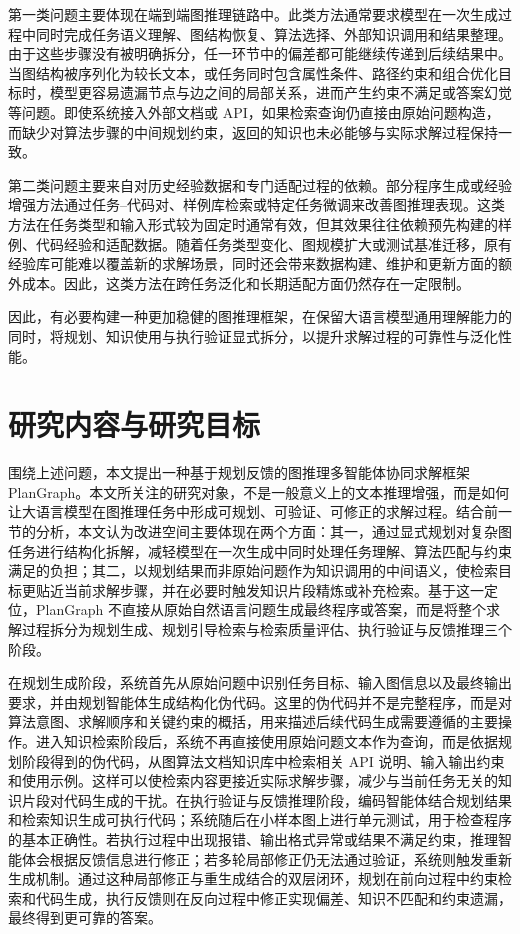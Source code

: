 第一类问题主要体现在端到端图推理链路中。此类方法通常要求模型在一次生成过程中同时完成任务语义理解、图结构恢复、算法选择、外部知识调用和结果整理。由于这些步骤没有被明确拆分，任一环节中的偏差都可能继续传递到后续结果中。当图结构被序列化为较长文本，或任务同时包含属性条件、路径约束和组合优化目标时，模型更容易遗漏节点与边之间的局部关系，进而产生约束不满足或答案幻觉等问题。即使系统接入外部文档或 API，如果检索查询仍直接由原始问题构造，而缺少对算法步骤的中间规划约束，返回的知识也未必能够与实际求解过程保持一致。

第二类问题主要来自对历史经验数据和专门适配过程的依赖。部分程序生成或经验增强方法通过任务--代码对、样例库检索或特定任务微调来改善图推理表现。这类方法在任务类型和输入形式较为固定时通常有效，但其效果往往依赖预先构建的样例、代码经验和适配数据。随着任务类型变化、图规模扩大或测试基准迁移，原有经验库可能难以覆盖新的求解场景，同时还会带来数据构建、维护和更新方面的额外成本。因此，这类方法在跨任务泛化和长期适配方面仍然存在一定限制。

因此，有必要构建一种更加稳健的图推理框架，在保留大语言模型通用理解能力的同时，将规划、知识使用与执行验证显式拆分，以提升求解过程的可靠性与泛化性能。

\section{研究内容与研究目标}

围绕上述问题，本文提出一种基于规划反馈的图推理多智能体协同求解框架 PlanGraph。本文所关注的研究对象，不是一般意义上的文本推理增强，而是如何让大语言模型在图推理任务中形成可规划、可验证、可修正的求解过程。结合前一节的分析，本文认为改进空间主要体现在两个方面：其一，通过显式规划对复杂图任务进行结构化拆解，减轻模型在一次生成中同时处理任务理解、算法匹配与约束满足的负担；其二，以规划结果而非原始问题作为知识调用的中间语义，使检索目标更贴近当前求解步骤，并在必要时触发知识片段精炼或补充检索。基于这一定位，PlanGraph 不直接从原始自然语言问题生成最终程序或答案，而是将整个求解过程拆分为规划生成、规划引导检索与检索质量评估、执行验证与反馈推理三个阶段。

在规划生成阶段，系统首先从原始问题中识别任务目标、输入图信息以及最终输出要求，并由规划智能体生成结构化伪代码。这里的伪代码并不是完整程序，而是对算法意图、求解顺序和关键约束的概括，用来描述后续代码生成需要遵循的主要操作。进入知识检索阶段后，系统不再直接使用原始问题文本作为查询，而是依据规划阶段得到的伪代码，从图算法文档知识库中检索相关 API 说明、输入输出约束和使用示例。这样可以使检索内容更接近实际求解步骤，减少与当前任务无关的知识片段对代码生成的干扰。在执行验证与反馈推理阶段，编码智能体结合规划结果和检索知识生成可执行代码；系统随后在小样本图上进行单元测试，用于检查程序的基本正确性。若执行过程中出现报错、输出格式异常或结果不满足约束，推理智能体会根据反馈信息进行修正；若多轮局部修正仍无法通过验证，系统则触发重新生成机制。通过这种局部修正与重生成结合的双层闭环，规划在前向过程中约束检索和代码生成，执行反馈则在反向过程中修正实现偏差、知识不匹配和约束遗漏，最终得到更可靠的答案。

